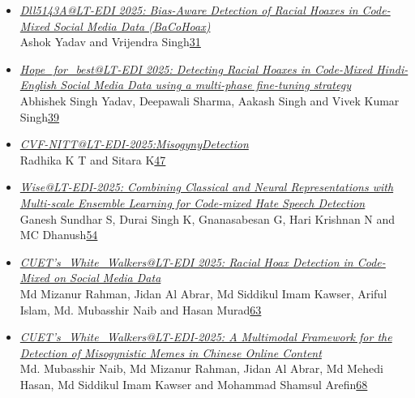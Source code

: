 \documentclass[11pt,oneside]{book}
\begin{document}
\begin{itemize}[leftmargin=*,label={}]
       \item \hyperlink{page.31}{\emph{Dll5143A@LT-EDI 2025: Bias-Aware Detection of Racial Hoaxes in Code-Mixed Social Media Data (BaCoHoax)}}\\ \hspace*{2em} Ashok Yadav and Vrijendra Singh\dotfill \hyperlink{page.31}{31}
       \item \hyperlink{page.39}{\emph{Hope\_for\_best@LT-EDI 2025: Detecting Racial Hoaxes in Code-Mixed Hindi-English Social Media Data using a multi-phase fine-tuning strategy}}\\ \hspace*{2em} Abhishek Singh Yadav, Deepawali Sharma, Aakash Singh and Vivek Kumar Singh\dotfill \hyperlink{page.39}{39}
       \item \hyperlink{page.47}{\emph{CVF-NITT@LT-EDI-2025:MisogynyDetection}}\\ \hspace*{2em} Radhika K T and Sitara K\dotfill \hyperlink{page.47}{47}
       \item \hyperlink{page.54}{\emph{Wise@LT-EDI-2025: Combining Classical and Neural Representations with Multi-scale Ensemble Learning for Code-mixed Hate Speech Detection}}\\ \hspace*{2em} Ganesh Sundhar S, Durai Singh K, Gnanasabesan G, Hari Krishnan N and MC Dhanush\dotfill \hyperlink{page.54}{54}
       \item \hyperlink{page.63}{\emph{CUET's\_White\_Walkers@LT-EDI 2025: Racial Hoax Detection in Code-Mixed on Social Media Data}}\\ \hspace*{2em} Md Mizanur Rahman, Jidan Al Abrar, Md Siddikul Imam Kawser, Ariful Islam, Md. Mubasshir Naib and Hasan Murad\dotfill \hyperlink{page.63}{63}
       \item \hyperlink{page.68}{\emph{CUET's\_White\_Walkers@LT-EDI-2025: A Multimodal Framework for the Detection of Misogynistic Memes in Chinese Online Content}}\\ \hspace*{2em} Md. Mubasshir Naib, Md Mizanur Rahman, Jidan Al Abrar, Md Mehedi Hasan, Md Siddikul Imam Kawser and Mohammad Shamsul Arefin\dotfill \hyperlink{page.68}{68}

\end{itemize}
\end{document}
